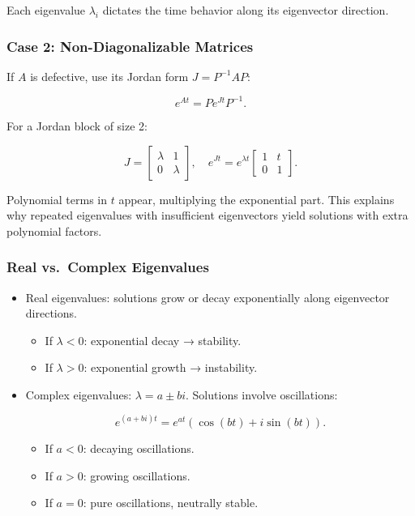 \documentclass[
  letterpaper,
  DIV=11,
  numbers=noendperiod]{scrreprt}
\providecommand{\tightlist}{%
  \setlength{\itemsep}{0pt}\setlength{\parskip}{0pt}}
\begin{document}
Each eigenvalue \(\lambda_i\) dictates the time behavior along its
eigenvector direction.

\subsubsection{Case 2: Non-Diagonalizable
Matrices}\label{case-2-non-diagonalizable-matrices}

If \(A\) is defective, use its Jordan form \(J = P^{-1}AP\):

\[
e^{At} = P e^{Jt} P^{-1}.
\]

For a Jordan block of size 2:

\[
J = \begin{bmatrix} \lambda & 1 \\ 0 & \lambda \end{bmatrix}, \quad
e^{Jt} = e^{\lambda t} \begin{bmatrix} 1 & t \\ 0 & 1 \end{bmatrix}.
\]

Polynomial terms in \(t\) appear, multiplying the exponential part. This
explains why repeated eigenvalues with insufficient eigenvectors yield
solutions with extra polynomial factors.

\subsubsection{Real vs.~Complex
Eigenvalues}\label{real-vs.-complex-eigenvalues}

\begin{itemize}
\item
  Real eigenvalues: solutions grow or decay exponentially along
  eigenvector directions.

  \begin{itemize}
  \tightlist
  \item
    If \(\lambda < 0\): exponential decay → stability.
  \item
    If \(\lambda > 0\): exponential growth → instability.
  \end{itemize}
\item
  Complex eigenvalues: \(\lambda = a \pm bi\). Solutions involve
  oscillations:

  \[
  e^{(a+bi)t} = e^{at}(\cos(bt) + i \sin(bt)).
  \]

  \begin{itemize}
  \tightlist
  \item
    If \(a < 0\): decaying oscillations.
  \item
    If \(a > 0\): growing oscillations.
  \item
    If \(a = 0\): pure oscillations, neutrally stable.
  \end{itemize}
\end{itemize}
\end{document}
